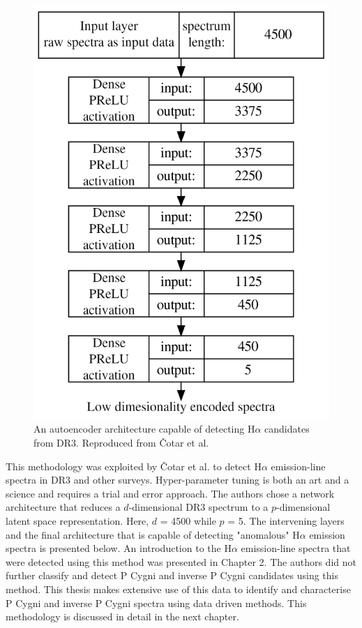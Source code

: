 \begin{figure}[!htb]
\centering
\includegraphics[scale=0.45]{figures/autoencoder.png}
\caption{An autoencoder architecture capable of detecting H$\alpha$ candidates from DR3. Reproduced from Čotar et al.\cite{vcotar2021galah}}
\end{figure}

This methodology was exploited by Čotar et al. to detect H$\alpha$ emission-line spectra in DR3 and other surveys\cite{vcotar2021galah}. Hyper-parameter tuning is both an art and a science and requires a trial and error approach. The authors chose a network architecture that reduces a $d$-dimensional DR3 spectrum to a $p$-dimensional latent space representation. Here, $d$ = 4500 while $p$ = 5. The intervening layers and the final architecture that is capable of detecting "anomalous" H$\alpha$ emission spectra is presented below. An introduction to the H$\alpha$ emission-line spectra that were detected using this method was presented in Chapter 2. The authors did not further classify and detect P Cygni and inverse P Cygni candidates using this method. This thesis makes extensive use of this data to identify and characterise P Cygni and inverse P Cygni spectra using data driven methods. This methodology is discussed in detail in the next chapter. 

